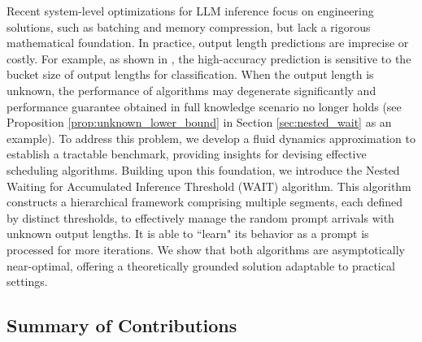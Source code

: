 Recent system-level optimizations for LLM inference \citep{yu2022orca, kwon2023efficient, agrawal2023sarathi, pope2023efficiently, deepseekai2024deepseekv2strongeconomicalefficient, patel2024splitwise, zhong2024distserve} focus on engineering solutions, such as batching and memory compression, but lack a rigorous mathematical foundation. 
In practice, output length predictions are imprecise or costly. For example, as shown in \cite{fu2025efficient}, the high-accuracy prediction is sensitive to the bucket size of output lengths for classification. When the output length is unknown, the performance of algorithms may degenerate significantly and performance guarantee obtained in full knowledge scenario no longer holds (see Proposition \ref{prop:unknown_lower_bound} in Section \ref{sec:nested_wait} as an example). To address this problem, we develop a fluid dynamics approximation to establish a tractable benchmark, providing insights for devising effective scheduling algorithms. Building upon this foundation, we introduce the Nested Waiting for Accumulated Inference Threshold (WAIT) algorithm. This algorithm constructs a hierarchical framework comprising multiple segments, each defined by distinct thresholds, to effectively manage the random prompt arrivals with unknown output lengths. It is able to ``learn" its behavior as a prompt is processed for more iterations. We show that both algorithms are asymptotically near-optimal, offering a theoretically grounded solution adaptable to practical settings. 

\subsection{Summary of Contributions}

